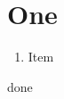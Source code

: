 \documentclass{article}
\begin{document}
\section{One}\label{L:d}
\begin{enumerate}
\renewcommand{\theenumi}{\Roman{enumi}}
\item Item\label{L:d}
\end{enumerate}
done
\end{document}
